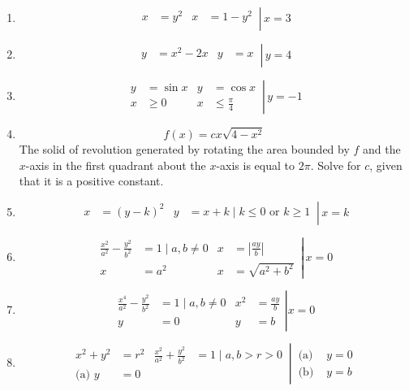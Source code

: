 \documentclass[12pt, A4]{report}
\begin{document}
\begin{enumerate}
\[\begin{aligned}
							y &= x^2 &
							y &= 2x \\
						\end{aligned}\,\right|\, x = 0
					\]
				\item
					\[
						\left.\begin{aligned}
							x &= y^2 &
								x &= 1 - y^2 \\
						\end{aligned}\,\right|\, x = 3
					\]
				\item
					\[
						\left.\begin{aligned}
							y &= x^2 - 2x &
								y &= x \\
						\end{aligned}\,\right|\, y = 4
					\]
				\item
					\[
						\left.\begin{aligned}
							y &= \sin x &
								y &= \cos x \\
							x &\ge 0 & 
								x &\le \frac{\pi}{4}
						\end{aligned}\,\right|\, y = -1
					\]
				\item
					\[f(x) = cx\sqrt{4 - x^2}\]
					The solid of revolution generated by rotating the area bounded by $f$ and the $x$-axis in the first quadrant about the $x$-axis is equal to $2\pi$. Solve for $c$, given that it is a positive constant.
				\item
					\[
						\left.\begin{aligned}
							x &= (y - k)^2 &
								y &= x + k \mid k \le 0 \text{ or } k \ge 1 \\
						\end{aligned}\,\right|\, x = k
					\]
				\item
					\[
						\left.\begin{aligned}
							\frac{x^2}{a^2} - \frac{y^2}{b^2} &= 1 \mid a, b \ne 0 &
								x &= \left|\frac{ay}{b}\right| \\
							x &= a^2 &
								x &= \sqrt{a^2 + b^2}
						\end{aligned}\,\right|\, x = 0
					\]
				\item
				\[
					\left.\begin{aligned}
						\frac{x^4}{a^2} - \frac{y^2}{b^2} &= 1 \mid a, b \ne 0 &
							x^2 &= \frac{ay}{b} \\
						y &= 0 &
							y &= b
					\end{aligned}\right| x = 0
				\]
				\item
					\[
						\left.\begin{aligned}
							x^2 + y^2 &= r^2 & 
								\frac{x^2}{a^2} + \frac{y^2}{b^2} &= 1 
								\mid a, b > r > 0\\
							\text{(a) } y &= 0
						\end{aligned}\,\right|\,
						\begin{aligned}
							\text{(a) } &y = 0 \\
							\text{(b) } &y = b
						\end{aligned}
					\]
			\end{enumerate}
			\newpage
\end{document}
